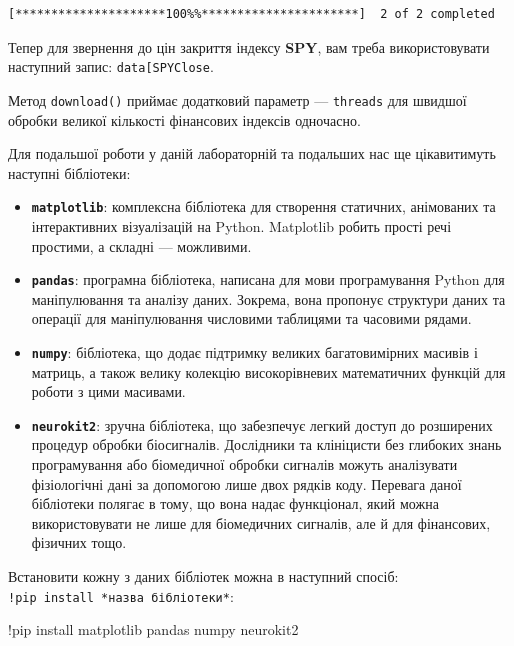 \documentclass[
  letterpaper,
]{report}
\newenvironment{Shaded}{\begin{snugshade}}{\end{snugshade}}
\newcommand{\NormalTok}[1]{\textcolor[rgb]{0.00,0.23,0.31}{#1}}
\newcommand{\OperatorTok}[1]{\textcolor[rgb]{0.37,0.37,0.37}{#1}}
\providecommand{\tightlist}{%
  \setlength{\itemsep}{0pt}\setlength{\parskip}{0pt}}\usepackage{longtable,booktabs,array}
\begin{document}
\begin{verbatim}
[*********************100%%**********************]  2 of 2 completed
\end{verbatim}

Тепер для звернення до цін закриття індексу \textbf{SPY}, вам треба
використовувати наступний запис:
\texttt{data{[}\textquotesingle{}SPY\textquotesingle{}{]}{[}\textquotesingle{}Close\textquotesingle{}{]}}.

Метод \texttt{download()} приймає додатковий параметр ---
\texttt{threads} для швидшої обробки великої кількості фінансових
індексів одночасно.

Для подальшої роботи у даній лабораторній та подальших нас ще
цікавитимуть наступні бібліотеки:

\begin{itemize}
\tightlist
\item
  \textbf{\texttt{matplotlib}}: комплексна бібліотека для створення
  статичних, анімованих та інтерактивних візуалізацій на Python.
  Matplotlib робить прості речі простими, а складні --- можливими.
\item
  \textbf{\texttt{pandas}}: програмна бібліотека, написана для мови
  програмування Python для маніпулювання та аналізу даних. Зокрема, вона
  пропонує структури даних та операції для маніпулювання числовими
  таблицями та часовими рядами.
\item
  \textbf{\texttt{numpy}}: бібліотека, що додає підтримку великих
  багатовимірних масивів і матриць, а також велику колекцію
  високорівневих математичних функцій для роботи з цими масивами.
\item
  \textbf{\texttt{neurokit2}}: зручна бібліотека, що забезпечує легкий
  доступ до розширених процедур обробки біосигналів. Дослідники та
  клініцисти без глибоких знань програмування або біомедичної обробки
  сигналів можуть аналізувати фізіологічні дані за допомогою лише двох
  рядків коду. Перевага даної бібліотеки полягає в тому, що вона надає
  функціонал, який можна використовувати не лише для біомедичних
  сигналів, але й для фінансових, фізичних тощо.
\end{itemize}

Встановити кожну з даних бібліотек можна в наступний спосіб:
\texttt{!pip\ install\ *назва\ бібліотеки*}:

\begin{Shaded}
\begin{Highlighting}[]
\OperatorTok{!}\NormalTok{pip install matplotlib pandas numpy neurokit2}
\end{Highlighting}
\end{Shaded}
\end{document}
